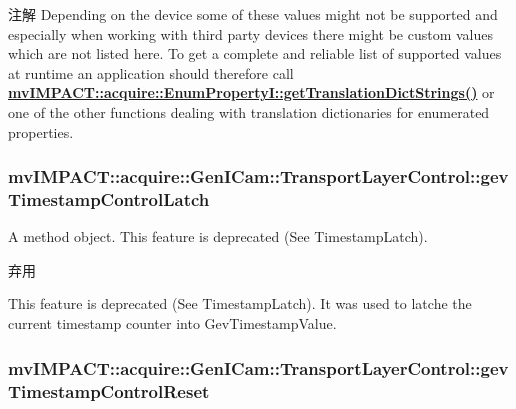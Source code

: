 \begin{DoxyNote}{注解}
Depending on the device some of these values might not be supported and especially when working with third party devices there might be custom values which are not listed here. To get a complete and reliable list of supported values at runtime an application should therefore call {\bfseries \hyperlink{classmv_i_m_p_a_c_t_1_1acquire_1_1_enum_property_i_a0ba6ccbf5ee69784d5d0b537924d26b6}{mv\+I\+M\+P\+A\+C\+T\+::acquire\+::\+Enum\+Property\+I\+::get\+Translation\+Dict\+Strings()}} or one of the other functions dealing with translation dictionaries for enumerated properties. 
\end{DoxyNote}
\hypertarget{classmv_i_m_p_a_c_t_1_1acquire_1_1_gen_i_cam_1_1_transport_layer_control_a57adc9d8ec47465e1f2dc1e1807517e2}{
\subsubsection[{gev\+Timestamp\+Control\+Latch}]{ mv\+I\+M\+P\+A\+C\+T\+::acquire\+::\+Gen\+I\+Cam\+::\+Transport\+Layer\+Control\+::gev\+Timestamp\+Control\+Latch}}\label{classmv_i_m_p_a_c_t_1_1acquire_1_1_gen_i_cam_1_1_transport_layer_control_a57adc9d8ec47465e1f2dc1e1807517e2}


A method object. This feature is deprecated (See Timestamp\+Latch). 

\begin{DoxyRefDesc}{弃用}
\item[\hyperlink{deprecated__deprecated000079}{弃用}]This feature is deprecated (See Timestamp\+Latch). It was used to latche the current timestamp counter into Gev\+Timestamp\+Value. \end{DoxyRefDesc}
\hypertarget{classmv_i_m_p_a_c_t_1_1acquire_1_1_gen_i_cam_1_1_transport_layer_control_a8756dbc39c18e2b1c21afd9d5a2eb68d}{
\subsubsection[{gev\+Timestamp\+Control\+Reset}]{ mv\+I\+M\+P\+A\+C\+T\+::acquire\+::\+Gen\+I\+Cam\+::\+Transport\+Layer\+Control\+::gev\+Timestamp\+Control\+Reset}}\label{classmv_i_m_p_a_c_t_1_1acquire_1_1_gen_i_cam_1_1_transport_layer_control_a8756dbc39c18e2b1c21afd9d5a2eb68d}



